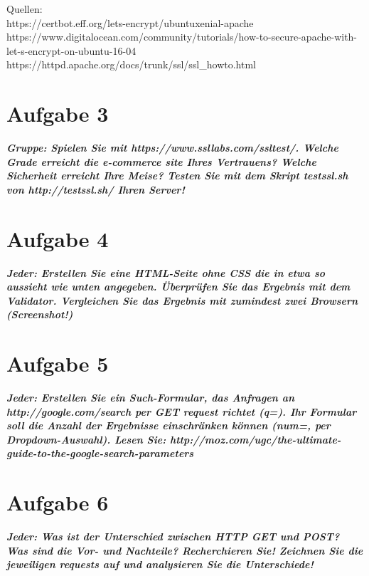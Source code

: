 \documentclass[12pt, a4paper]{report}
\begin{document}
Quellen:\\
https://certbot.eff.org/lets-encrypt/ubuntuxenial-apache\\
https://www.digitalocean.com/community/tutorials/how-to-secure-apache-with-let-s-encrypt-on-ubuntu-16-04\\
https://httpd.apache.org/docs/trunk/ssl/ssl\_howto.html


\section*{Aufgabe 3}
\textbf{\textit{Gruppe: Spielen Sie mit https://www.ssllabs.com/ssltest/. Welche Grade erreicht
die e-commerce site Ihres Vertrauens? Welche Sicherheit erreicht Ihre Meise? Testen Sie
mit dem Skript testssl.sh von http://testssl.sh/ Ihren Server!}}

\section*{Aufgabe 4}
\textbf{\textit{Jeder: Erstellen Sie eine HTML-Seite ohne CSS die in etwa so aussieht wie unten angegeben.
Überprüfen Sie das Ergebnis mit dem Validator. Vergleichen Sie das Ergebnis
mit zumindest zwei Browsern (Screenshot!)}}

\section*{Aufgabe 5}
\textbf{\textit{Jeder: Erstellen Sie ein Such-Formular, das Anfragen an http://google.com/search
per GET request richtet (q=). Ihr Formular soll die Anzahl der Ergebnisse einschränken
können (num=, per Dropdown-Auswahl).
Lesen Sie: http://moz.com/ugc/the-ultimate-guide-to-the-google-search-parameters}}

\section*{Aufgabe 6}
\textbf{\textit{Jeder: Was ist der Unterschied zwischen HTTP GET und POST? Was sind die Vor- und
Nachteile? Recherchieren Sie! Zeichnen Sie die jeweiligen requests auf und analysieren
Sie die Unterschiede!}}
\end{document}
